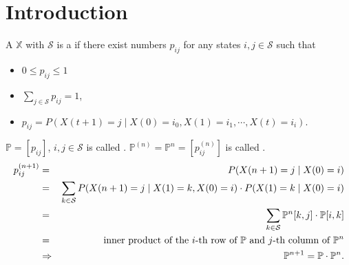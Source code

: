 \section{Introduction}

\begin{definition}
A  $ \mathbb{X} $ with  $ \mathcal{S} $ is a  if there exist numbers $ p_{ij} $ for any states $ i, j \in \mathcal{S} $ such that 
\begin{itemize}
\item $ 0 \le p_{ij} \le 1 $ 
\item $ \sum_{j \in \mathcal{S}} p_{ij} = 1 $,
\item $ p_{ij} = P(X(t + 1) = j \mid X(0) = i_{0}, X(1) = i_{1}, \cdots, X(t) = i_{i}). $
\end{itemize}

\begin{comment}
The above conditional probability is independent $ i_{0}, \cdots, i_{t - 1} $, and $ t $. Therefore,
\[ P(X(t + 1) = j \mid X(t) = i_{i}) = P(X(t + l + 1) = j \mid X(t + l) = i_{i}). \]
\end{comment}
\end{definition}

\begin{definition}
$ \mathbb{P} = [ p_{ij} ] $, $ i, j \in \mathcal{S} $ is called .
$ \mathbb{P}^{(n)} = \mathbb{P}^{n} = [ p^{(n)}_{ij} ] $ is called .
\begin{eqnarray*}
p^{(n + 1)}_{ij}
  & = & P(X(n + 1) = j \mid X(0) = i) \\
  & = & \sum_{k \in \mathcal{S}} P(X(n + 1) = j \mid X(1) = k, X(0) = i) \cdot P(X(1) = k \mid X(0) = i) \\
  & = & \sum_{k \in \mathcal{S}} \mathbb{P}^{n}[k, j] \cdot \mathbb{P}[i, k] \\
  & = & \text{inner product of the $ i $-th row of $ \mathbb{P} $ and $ j $-th column of $ \mathbb{P}^{n} $} \\
  & \Rightarrow & \mathbb{P}^{n + 1} = \mathbb{P} \cdot \mathbb{P}^{n}.
\end{eqnarray*}
\begin{comment}
There are several properties about a matrix of transition probabilities. 
\begin{itemize}
\item $\mathbb{P} \text{ models } \mathbb{X}$
\item Any row summation of $\mathbb{P} = 1$.
\item $0\leq\text{column summation of }\mathbb{P}\leq\text{size of }\mathcal{S}$
\end{itemize}
\end{comment}
\end{definition}

